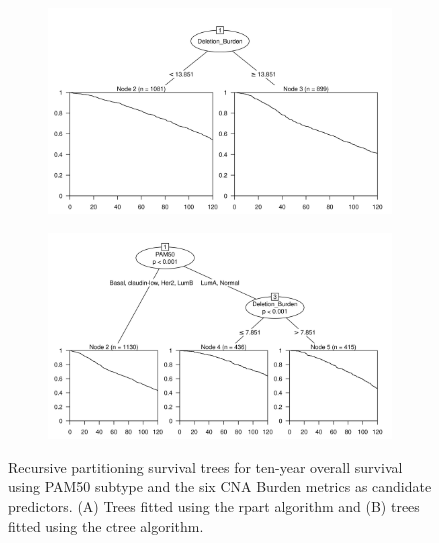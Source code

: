 \begin{figure}[!htb]
\centering

\vspace{0.5cm}

\begin{subfigure}{\textwidth}
\subcaption{}
\includegraphics[width=1\textwidth]{../figures/Appendices/Appendix_B/PartyKit_Survival_Burden_TenYearOS_PAM50.png}
\end{subfigure}

\vspace{2cm}

\begin{subfigure}{\textwidth}
\subcaption{}
\includegraphics[width=1\textwidth]{../figures/Appendices/Appendix_B/Ctree_Survival_Burden_TenYearOS_PAM50.png}
\end{subfigure}

\vspace{0.5cm}

\caption[Recursive partitioning survival trees for ten-year overall survival using PAM50 subtype and the six CNA Burden metrics as candidate predictors.]{Recursive partitioning survival trees for ten-year overall survival using PAM50 subtype and the six CNA Burden metrics as candidate predictors. (A) Trees fitted using the rpart algorithm and (B) trees fitted using the ctree algorithm.}
\end{figure}

